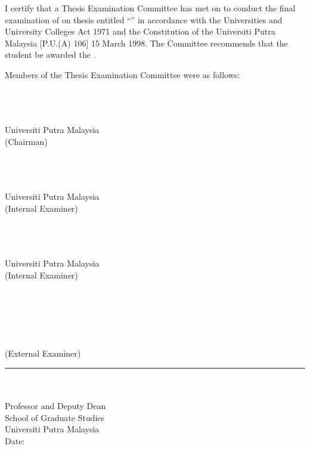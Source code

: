 
I certify that a Thesis Examination Committee has met on {\infovivaday} {\infovivamonth} {\infovivayear} to conduct the final examination of {\infostudentname} on {\infostudentpronoun} thesis entitled “\infothesistitle” in accordance with the Universities and University Colleges Act 1971 and the Constitution of the Universiti Putra Malaysia [P.U.(A) 106] 15 March 1998. The Committee recommends that the student be awarded the \infodegreename.

Members of the Thesis Examination Committee were as follows:

\textbf{\infochairpersonname \infochairpersondegree} \\
\infochairpersontitle \\
\infochairpersonfaculty \\
Universiti Putra Malaysia \\
(Chairman)

\textbf{\infoexamineronename \infoexamineronedegree} \\
\infoexamineronetitle \\
\infoexamineronefaculty \\
Universiti Putra Malaysia \\
(Internal Examiner)

\textbf{\infoexaminertwoname \infoexaminertwodegree} \\
\infoexaminertwotitle \\
\infoexaminertwofaculty \\
Universiti Putra Malaysia \\
(Internal Examiner)

\textbf{\infoexternalexaminername \infoexternalexaminerdegree} \\
\infoexternalexaminertitle \\
\infoexternalexaminerdepartment \\
\infoexternalexamineruniversity \\
\infoexternalexaminercountry \\
(External Examiner)

\begin{minipage}[t]{0.5\textwidth}
    \hfill
\end{minipage}
\begin{minipage}[t]{0.5\textwidth}
    \rule{6cm}{0.4pt} \\
    \textbf{\infodeputydeanname \infodeputydeandegree} \\
    Professor and Deputy Dean \\
    School of Graduate Studies \\
    Universiti Putra Malaysia \\

    Date:
\end{minipage}

